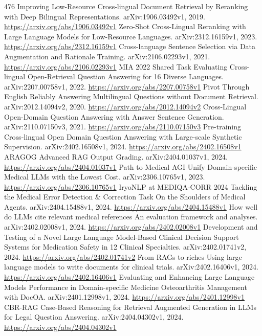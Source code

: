 \documentclass[11pt]{article}
\begin{document}
\begin{thebibliography}{476}
 Improving Low-Resource Cross-lingual Document Retrieval by Reranking with Deep Bilingual Representations. arXiv:1906.03492v1, 2019. \url{https://arxiv.org/abs/1906.03492v1}
 Zero-Shot Cross-Lingual Reranking with Large Language Models for Low-Resource Languages. arXiv:2312.16159v1, 2023. \url{https://arxiv.org/abs/2312.16159v1}
 Cross-language Sentence Selection via Data Augmentation and Rationale Training. arXiv:2106.02293v1, 2021. \url{https://arxiv.org/abs/2106.02293v1}
 MIA 2022 Shared Task Evaluating Cross-lingual Open-Retrieval Question Answering for 16 Diverse Languages. arXiv:2207.00758v1, 2022. \url{https://arxiv.org/abs/2207.00758v1}
 Pivot Through English Reliably Answering Multilingual Questions without Document Retrieval. arXiv:2012.14094v2, 2020. \url{https://arxiv.org/abs/2012.14094v2}
 Cross-Lingual Open-Domain Question Answering with Answer Sentence Generation. arXiv:2110.07150v3, 2021. \url{https://arxiv.org/abs/2110.07150v3}
 Pre-training Cross-lingual Open Domain Question Answering with Large-scale Synthetic Supervision. arXiv:2402.16508v1, 2024. \url{https://arxiv.org/abs/2402.16508v1}
 ARAGOG Advanced RAG Output Grading. arXiv:2404.01037v1, 2024. \url{https://arxiv.org/abs/2404.01037v1}
 Path to Medical AGI Unify Domain-specific Medical LLMs with the Lowest Cost. arXiv:2306.10765v1, 2023. \url{https://arxiv.org/abs/2306.10765v1}
 IryoNLP at MEDIQA-CORR 2024 Tackling the Medical Error Detection \& Correction Task On the Shoulders of Medical Agents. arXiv:2404.15488v1, 2024. \url{https://arxiv.org/abs/2404.15488v1}
 How well do LLMs cite relevant medical references An evaluation framework and analyses. arXiv:2402.02008v1, 2024. \url{https://arxiv.org/abs/2402.02008v1}
 Development and Testing of a Novel Large Language Model-Based Clinical Decision Support Systems for Medication Safety in 12 Clinical Specialties. arXiv:2402.01741v2, 2024. \url{https://arxiv.org/abs/2402.01741v2}
 From RAGs to riches Using large language models to write documents for clinical trials. arXiv:2402.16406v1, 2024. \url{https://arxiv.org/abs/2402.16406v1}
 Evaluating and Enhancing Large Language Models Performance in Domain-specific Medicine Osteoarthritis Management with DocOA. arXiv:2401.12998v1, 2024. \url{https://arxiv.org/abs/2401.12998v1}
 CBR-RAG Case-Based Reasoning for Retrieval Augmented Generation in LLMs for Legal Question Answering. arXiv:2404.04302v1, 2024. \url{https://arxiv.org/abs/2404.04302v1}

\end{thebibliography}
\end{document}
